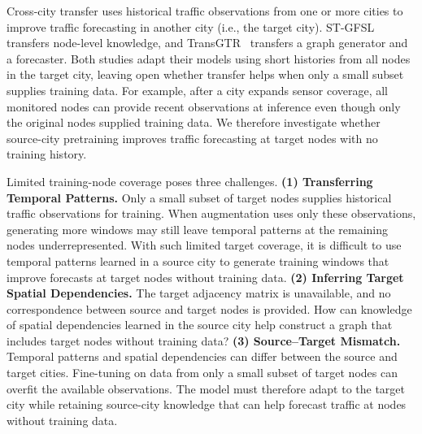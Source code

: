 \documentclass[runningheads,a4paper]{llncs}
\begin{document}
Cross-city transfer uses historical traffic observations from one or more cities to improve traffic forecasting in another city (i.e., the target city).
ST-GFSL~\cite{stgfsl} transfers node-level knowledge, and TransGTR~\cite{transgtr} transfers a graph generator and a forecaster.
Both studies adapt their models using short histories from all nodes in the target city, leaving open whether transfer helps when only a small subset supplies training data.
For example, after a city expands sensor coverage, all monitored nodes can provide recent observations at inference even though only the original nodes supplied training data.
We therefore investigate whether source-city pretraining improves traffic forecasting at target nodes with no training history.


Limited training-node coverage poses three challenges. \textbf{(1) Transferring Temporal Patterns.} Only a small subset of target nodes supplies historical traffic observations for training. When augmentation uses only these observations, generating more windows may still leave temporal patterns at the remaining nodes underrepresented. With such limited target coverage, it is difficult to use temporal patterns learned in a source city to generate training windows that improve forecasts at target nodes without training data. \textbf{(2) Inferring Target Spatial Dependencies.} The target adjacency matrix is unavailable, and no correspondence between source and target nodes is provided. How can knowledge of spatial dependencies learned in the source city help construct a graph that includes target nodes without training data? \textbf{(3) Source--Target Mismatch.} Temporal patterns and spatial dependencies can differ between the source and target cities. Fine-tuning on data from only a small subset of target nodes can overfit the available observations. The model must therefore adapt to the target city while retaining source-city knowledge that can help forecast traffic at nodes without training data.
\end{document}
